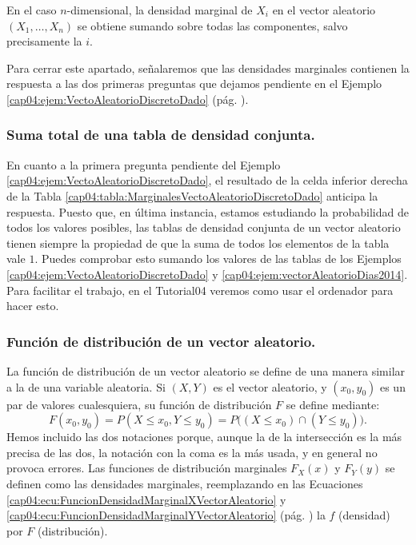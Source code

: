 En el caso $n$-dimensional, la densidad marginal de $X_i$ en el vector aleatorio $(X_1,\ldots, X_n)$ se obtiene sumando sobre todas las componentes, salvo precisamente la $i$.

Para cerrar este apartado, señalaremos que las densidades marginales contienen la respuesta a las dos primeras preguntas que dejamos pendiente en el Ejemplo \ref{cap04:ejem:VectoAleatorioDiscretoDado} (pág. \pageref{cap04:ejem:VectoAleatorioDiscretoDado}).

\subsubsection{Suma total de una tabla de densidad conjunta.}

En cuanto a la primera pregunta pendiente del Ejemplo \ref{cap04:ejem:VectoAleatorioDiscretoDado}, el resultado de la celda inferior derecha de la Tabla \ref{cap04:tabla:MarginalesVectoAleatorioDiscretoDado} anticipa la respuesta. Puesto que, en última instancia, estamos estudiando la probabilidad de todos los valores posibles, las tablas de densidad conjunta de un vector aleatorio tienen siempre la propiedad de que la suma de todos los elementos de la tabla vale $1$. Puedes comprobar esto sumando los valores de las tablas de los Ejemplos \ref{cap04:ejem:VectoAleatorioDiscretoDado} y \ref{cap04:ejem:vectorAleatorioDias2014}. Para facilitar el trabajo, en el Tutorial04 veremos como usar el ordenador para hacer esto.

\subsubsection{Función de distribución de un vector aleatorio.}

La {\sf función de distribución de un vector aleatorio} se define de una manera similar a la de una variable aleatoria. Si $(X,Y)$ es el vector aleatorio, y $(x_0,y_0)$ es un par de valores cualesquiera, su función de distribución $F$ se define mediante:
\begin{equation}
\label{cap04:ecu:FuncionDistribucionVectorAleatorio}
F(x_0, y_0) = P(X\leq x_0, Y\leq y_0)=P\bigg((X\leq x_0)\cap(Y\leq y_0)\bigg).
\end{equation}
Hemos incluido las dos notaciones porque, aunque la de la intersección es la más precisa de las dos, la notación con la coma es la más usada, y en general no provoca errores. Las {\sf funciones de distribución marginales} $F_X(x)$ y $F_Y(y)$ se definen como las densidades marginales, reemplazando en las Ecuaciones \ref{cap04:ecu:FuncionDensidadMarginalXVectorAleatorio} y \ref{cap04:ecu:FuncionDensidadMarginalYVectorAleatorio} (pág. \pageref{cap04:ecu:FuncionDensidadMarginalYVectorAleatorio}) la $f$ (densidad) por $F$ (distribución).


